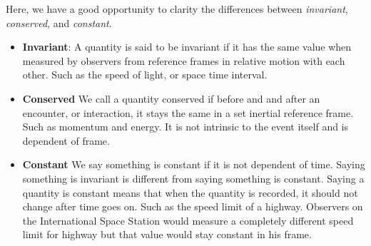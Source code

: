 \documentclass[11pt,letterpaper]{book}
\begin{document}
Here, we have a good opportunity to clarity the differences between \textit{invariant}, \textit{conserved}, and \textit{constant}. 
\begin{itemize}
    \item \textbf{Invariant}: A quantity is said to be invariant if it has the same value when measured by observers from reference frames in relative motion with each other. Such as the speed of light, or space time interval.
    \item \textbf{Conserved} We call a quantity conserved if before and and after an encounter, or interaction, it stays the same in a set inertial reference frame. Such as momentum and energy. It is not intrinsic to the event itself and is dependent of frame. 
    \item \textbf{Constant} We say something is constant if it is not dependent of time. Saying something is invariant is different from saying something is constant. Saying a quantity is constant means that when the quantity is recorded, it should not change after time goes on. Such as the speed limit of a highway. Observers on the International Space Station would measure a completely different speed limit for highway but that value would stay constant in his frame. 
\end{itemize}
\end{document}
